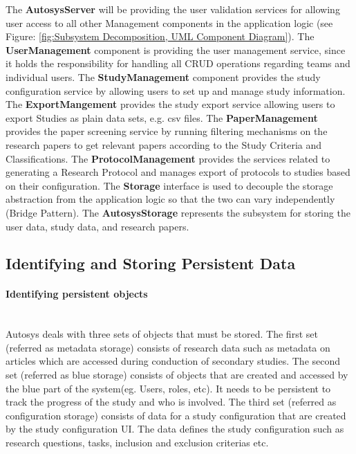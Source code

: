 The \textbf{AutosysServer} will be providing the user validation services for allowing user access to all other Management components in the application logic (see Figure: \ref{fig:Subsystem Decomposition, UML Component Diagram}).
The \textbf{UserManagement} component is providing the user management service, since it holds the responsibility for handling all CRUD operations regarding teams and individual users. The \textbf{StudyManagement} component  provides the study configuration service by allowing users to set up and manage study information.
The \textbf{ExportMangement} provides the study export service allowing users to export Studies as plain data sets, e.g. csv files.
The \textbf{PaperManagement} provides the paper screening service by running filtering mechanisms on the research papers to get relevant papers according to the Study Criteria and Classifications.
The \textbf{ProtocolManagement} provides the services related to generating a Research Protocol and manages export of protocols to studies based on their configuration. 
The\textbf{ Storage} interface is used to decouple the storage abstraction from the application logic so that the two can vary independently (Bridge Pattern). 
The \textbf{AutosysStorage} represents the subsystem for storing the user data, study data, and research papers.

\subsection{Identifying and Storing Persistent Data}
\paragraph{Identifying persistent objects}\mbox{}\\

Autosys deals with three sets of objects that must be stored.  The first set (referred as metadata storage) consists of research data such as metadata on articles which are accessed during conduction of secondary studies. The second set (referred as blue storage) consists of objects that are created and accessed by the blue part of the system(eg. Users, roles, etc). It needs to be persistent to track the progress of the study and who is involved. The third set (referred as configuration storage) consists of data for a study configuration that are created by the study configuration UI. The data defines the study configuration such as research questions, tasks, inclusion and exclusion criterias etc.\\\\ 

